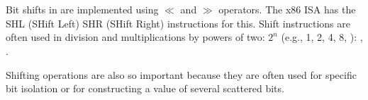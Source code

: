 \section{\ShiftsSectionName}

Bit shifts in \CCpp are implemented using $\ll$ and $\gg$ operators.
The x86 \ac{ISA} has the SHL (SHift Left) \AndENRU SHR (SHift Right) instructions for this.
Shift instructions are often used in division and multiplications by powers of two: $2^{n}$ (e.g., 1, 2, 4, 8, \etc{}):
,
.


Shifting operations are also so important because they are often used for specific bit isolation
or for constructing a value of several scattered bits.
